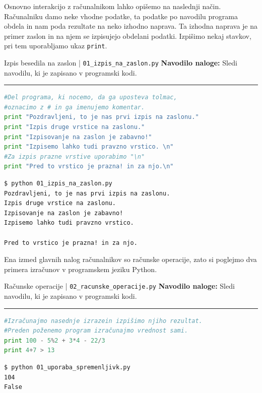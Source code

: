 Osnovno interakcijo z računalnikom lahko opišemo na naslednji
način. Računalniku damo neke vhodne podatke, ta podatke po navodilu
programa obdela in nam poda rezultate na neko izhodno naprava. Ta
izhodna naprava je na primer zaslon in na njem se izpisujejo obdelani
podatki. Izpišimo nekaj stavkov, pri tem uporabljamo ukaz
\texttt{print}.

\begin{examplebox}[label={prog:izpis}]{Izpis besedila na zaslon |
    \texttt{01\_izpis\_na\_zaslon.py} \cite{web:PTHardWay}}
  \textbf{Navodilo naloge:} Sledi navodilu, ki je zapisano v programski
  kodi.

\rule{\textwidth}{.4pt}
\begin{lstlisting}[language=Python]
#Del programa, ki nocemo, da ga uposteva tolmac,
#oznacimo z # in ga imenujemo komentar.
print "Pozdravljeni, to je nas prvi izpis na zaslonu."
print "Izpis druge vrstice na zaslonu."
print "Izpisovanje na zaslon je zabavno!"
print "Izpisemo lahko tudi pravzno vrstico. \n"
#Za izpis prazne vrstive uporabimo "\n"
print "Pred to vrstico je prazna! in za njo.\n"
\end{lstlisting}
\tcblower
\begin{Verbatim}[fontsize=\footnotesize]
$ python 01_izpis_na_zaslon.py
Pozdravljeni, to je nas prvi izpis na zaslonu.
Izpis druge vrstice na zaslonu.
Izpisovanje na zaslon je zabavno!
Izpisemo lahko tudi pravzno vrstico.

Pred to vrstico je prazna! in za njo.
\end{Verbatim}
\end{examplebox}

Ena izmed glavnih nalog računalnikov so računske operacije, zato si
poglejmo dva primera izračunov v programskem jeziku Python.

\begin{examplebox}[label={prog:racunske_operacije}]{Računske operacije |
    \texttt{02\_racunske\_operacije.py} \cite{web:PTHardWay}}
  \textbf{Navodilo naloge:} Sledi navodilu, ki je zapisano v programski
  kodi.

\rule{\textwidth}{.4pt}
\begin{lstlisting}[language=Python]
#Izračunajmo nasednje izrazein izpišimo njiho rezultat.
#Preden poženemo program izračunajmo vrednost sami.
print 100 - 5%2 + 3*4 - 22/3
print 4+7 > 13
\end{lstlisting}
\tcblower
\begin{Verbatim}[fontsize=\footnotesize]
$ python 01_uporaba_spremenljivk.py
104
False
\end{Verbatim}
\end{examplebox}



